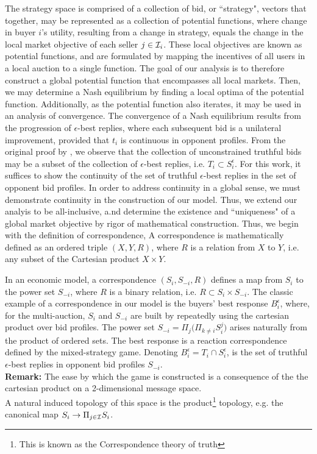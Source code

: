 The strategy space is comprised of a collection of bid, or ``strategy", vectors that
together, may be represented as a collection of potential functions, where change in buyer $i$'s
utility, resulting from a change in strategy, equals the change in
the local market objective of each seller $j\in\mathcal{I}_i$. These local objectives are known as potential functions, and are
formulated by mapping the incentives of all users in a local auction to a
single function. The goal of our analysis is to therefore construct a global potential function that encompasses
all local markets. Then, we may determine a Nash equilibrium by finding a local
optima of the potential function. Additionally, as the potential function also
iterates, it may be used in an analysis of convergence. The
convergence of a Nash equilibrium results from the progression of
$\epsilon$-best replies, where each subsequent bid is a unilateral
improvement, provided that $t_i$ is continuous in opponent profiles.
From the original proof by \cite{lazar}, we observe that the collection of
unconstrained truthful bids may be a subset
of the collection of $\epsilon$-best replies, i.e. $T_i\subset S_i^\epsilon$.         
For this work, it suffices to show the continuity of the set of truthful
$\epsilon$-best replies in the set of opponent bid profiles.
In order to address continuity in a global sense, we must demonstrate
continuity in the construction of our model.
Thus, we extend our analyis to be all-inclusive, %
a.nd determine the
existence and ``uniqueness" of a global market objective by rigor of mathematical construction. Thus, we begin with the definition of
correspondence,
{
A correspondence is mathematically defined as an ordered triple $(X,Y,R)$, where $R$ is a relation from $X$ to
$Y$, i.e. any subset of the Cartesian product $X\times Y$.
}

In an economic model, a correspondence $(S_i,S_{-i},R)$ defines a map from $S_i$
to the power set $S_{-i}$, where $R$ is a binary relation, i.e. $R \subset
S_i\times S_{-i}$. The classic
example of a correspondence in our model is the buyers' best response
$B_i^\epsilon$, where, for the multi-auction,
$S_i$ and $S_{-i}$ are built by repeatedly using the
cartesian product over bid profiles. The power set 
$S_{-i} =\Pi_j \big(\Pi_{k\ne i} S_i^j)$ arises naturally from the
product of ordered sets. 
The best response is a reaction correspondence
defined by the mixed-strategy game. Denoting  $B_i^\epsilon = T_i\cap
S_i^\epsilon$, is the set of truthful $\epsilon$-best replies in opponent bid
profiles $S_{-i}$. \\
\textbf{Remark:} 
The ease by which the game is constructed is a consequence of the the cartesian
product on a 2-dimensional message space. \\
A natural induced topology of this space is the product\footnote{This is known
as the Correspondence theory of truth}
topology, e.g. the canonical map $S_i \rightarrow \Pi_{j\in\mathcal{I}} S_i$.

